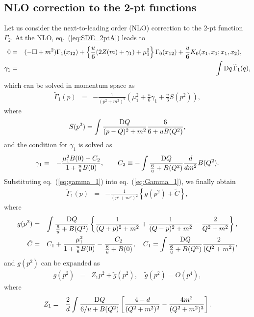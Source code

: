\documentclass[preprint]{ptephy_v1}%
\newcommand{\rmD}{{\rm D}}
\begin{document}
\subsection{NLO correction to the 2-pt functions}
Let us consider the next-to-leading order (NLO) correction to the 2-pt function $\Gamma_2$.
At the NLO, eq.~(\ref{eq:SDE_2ptA}) leads to
\begin{eqnarray}
0&=& (-\Box +m^2)\Gamma_1(x_{12}) +\left\{\frac{u}{6}(2 Z(m) + \gamma_1) +\mu^2_1\right\} \Gamma_0(x_{12}) +\frac{u}{6}K_0(x_1,x_1;x_1,x_2), ~~~~ \\
\gamma_1 &=& \int \rmD q\, \widetilde{\Gamma}_1(q), 
\end{eqnarray}
which can be solved in  momentum space as
\begin{eqnarray}
\widetilde{\Gamma}_1(p) &=& -\frac{1}{(p^2+m^2)^2}\left( \mu^2_1+\frac{u}{6}\gamma_1 + \frac{u}{3} S(p^2)\right), 
\label{eq:Gamma_1}
\end{eqnarray}
where
\begin{eqnarray}
S(p^2) =\int \frac{ \rmD Q }{(p-Q)^2+m^2}\frac{6}{6+u B(Q^2)} ,
\end{eqnarray}
and the condition for $\gamma_1$ is solved as
\begin{eqnarray}
\gamma_1 &=& - \frac{\mu_1^2 B(0) +C_2}{1+\frac{u}{6} B(0)}, \qquad
C_2\equiv - \int \frac{ \rmD Q }{\frac{6}{u}+ B(Q^2)}\frac{d }{d m^2} B(Q^2) .
\label{eq:gamma_1}
\end{eqnarray}
 Substituting  eq.~(\ref{eq:gamma_1}) into eq.~(\ref{eq:Gamma_1}), we finally obtain 
\begin{eqnarray}
\widetilde{\Gamma}_1(p) &=& - \frac{1}{(p^2+m^2)^2}\left\{ g(p^2) + \tilde C \right\},
\end{eqnarray}
where
\begin{eqnarray}
g(p^2) &=& \int \frac{\rmD Q}{\frac{6}{u} +B(Q^2)}\left\{ \frac{1}{(Q+p)^2+m^2} +  \frac{1}{(Q-p)^2+m^2} -  \frac{2}{Q^2+m^2}  \right\} , \\
\tilde C &=&  C_1 +\frac{\mu_1^2}{1+\frac{u}{6}B(0)}
-\frac{C_2}{\frac{6}{u}+B(0)} , \quad
C_1 =  \int \frac{\rmD Q}{\frac{6}{u} +B(Q^2)}  \frac{2}{(Q^2+m^2)}, 
\end{eqnarray}
and $g(p^2)$ can be expanded as
\begin{eqnarray}
g(p^2) &=& Z_1 p^2 + \tilde g(p^2), \quad \tilde g(p^2) = O(p^4),
\end{eqnarray}
where
\begin{eqnarray}
Z_1 &=&\frac{2}{d} \int \frac{\rmD Q}{6/u + B(Q^2)}\left[\frac{4-d}{(Q^2+m^2)^2} -\frac{4 m^2}{ (Q^2+m^2)^3}
\right] .
\label{eq:Z1}
\end{eqnarray}
\end{document}
